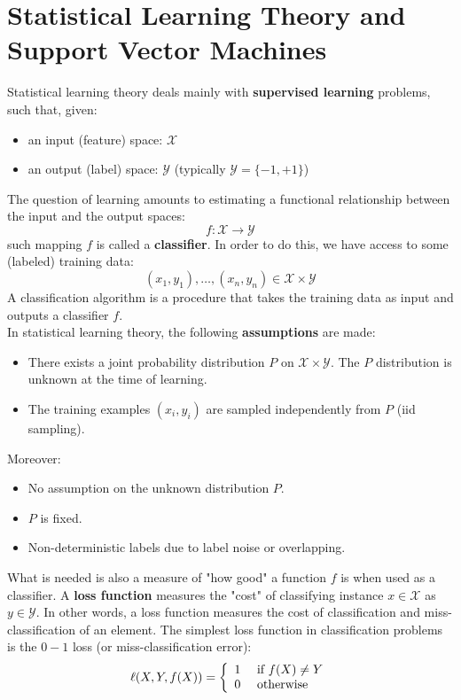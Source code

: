 \section{Statistical Learning Theory and Support Vector Machines}
Statistical learning theory deals mainly with \textbf{supervised learning} problems, such that, given:
\begin{itemize}
	\item an input (feature) space: $\mathcal{X}$
	\item an output (label) space: $\mathcal{Y}$ (typically $\mathcal{Y} = \{-1,+1\}$)
\end{itemize}
The question of learning amounts to estimating a functional relationship between the input and the output spaces:
$$f: \mathcal{X} \rightarrow \mathcal{Y}$$
such mapping $f$ is called a \textbf{classifier}. In order to do this, we have access to some (labeled) training data:
$$(x_1,y_1), \dots, (x_n, y_n) \in \mathcal{X} \times \mathcal{Y}$$
A classification algorithm is a procedure that takes the training data as input and outputs a classifier $f$.\\
In statistical learning theory, the following \textbf{assumptions} are made:
\begin{itemize}
	\item There exists a joint probability distribution $P$ on $\mathcal{X} \times \mathcal{Y}$. The $P$ distribution is unknown at the time of learning. 
	\item The training examples $(x_i, y_i)$ are sampled independently from $P$ (iid sampling).
\end{itemize}
Moreover:
\begin{itemize}
	\item No assumption on the unknown distribution $P$.
	\item $P$ is fixed.
	\item Non-deterministic labels due to label noise or overlapping.
\end{itemize}
What is needed is also a measure of "how good" a function $f$ is when used as a classifier. A \textbf{loss function} measures the "cost" of classifying instance $x \in \mathcal{X}$ as $y \in \mathcal{Y}$. In other words, a loss function measures the cost of classification and miss-classification of an element. The simplest loss function in classification problems is the $0-1$ loss (or miss-classification error):
$$
\ell ( X , Y , f ( X ) ) = 
\left\{ \begin{array} { l l } { 1 } & { \text { if } f ( X ) \neq Y } \\ 
{ 0 } & { \text { otherwise } } \end{array} \right.
$$
